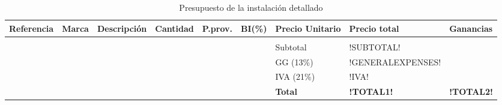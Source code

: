 \begin{spacing}{1.2}
\begin{longtable}{M{2cm}M{1.5cm}M{4.5cm}M{1.5cm}M{1.5cm}M{1.5cm}M{2cm}M{2cm}M{2cm}}
\caption{Presupuesto de la instalación detallado} \label{tab01-08}\\
\hline
\hline
\rule[-8pt]{0pt}{0pt}{\bfseries{Referencia}}& {\bfseries{Marca}} & {\bfseries{Descripción}} & {\bfseries{Cantidad}} & {\bfseries{P.prov.}} & {\bfseries{BI(\%)}} & {\bfseries{Precio Unitario}} & {\bfseries{Precio total}} & {\bfseries{Ganancias}}\\
\hline
\hline
& & & & & & & & \\

\hline
\hline
\vspace{0.5cm}
  &        &                                          &    &    &          & Subtotal & !SUBTOTAL! \\
\vspace{0.5cm}
  &        &                                          &    &    &          & GG (13\%) & !GENERALEXPENSES! \\
\vspace{0.5cm}
  &        &                                          &    &    &          & IVA (21\%) & !IVA! \\
\vspace{0.5cm}
  &        &                                          &    &    &          & \textbf{Total} & \textbf{!TOTAL1!} & \textbf{!TOTAL2!}\\
\end{longtable}
\end{spacing}			 
